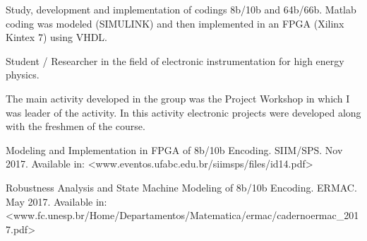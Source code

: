 \documentclass[10pt,a4paper,ragged2e]{altacv}
\begin{document}

Study, development and implementation of codings 8b/10b and 64b/66b. Matlab coding was modeled (SIMULINK) and then implemented in an FPGA (Xilinx Kintex 7) using VHDL. 

\divider

Student / Researcher in the field of electronic instrumentation for high energy physics.

\divider

The main activity developed in the group was the Project Workshop in which I was leader of the activity. In this activity electronic projects were developed along with the freshmen of the course.

\medskip




\nocite{*}

\printbibliography[heading=pubtype,title={\printinfo{\faBook}{Books}},type=book]


\printbibliography[heading=pubtype,title={\printinfo{\faFileTextO}{Artigos}}, type=article]
\printinfo{\faFileTextO}{}Modeling and Implementation in FPGA of 8b/10b Encoding. SIIM/SPS. Nov 2017. Available in: <www.eventos.ufabc.edu.br/siimsps/files/id14.pdf>

\divider

\printinfo{\faFileTextO}{}Robustness Analysis and State Machine Modeling of 8b/10b Encoding. ERMAC. May 2017. Available in: <www.fc.unesp.br/Home/Departamentos/Matematica/ermac/caderno\-ermac\_2017.pdf>

\printbibliography[heading=pubtype,title={\printinfo{\faGroup}{Conference Proceedings}},type=inproceedings]

\end{document}
